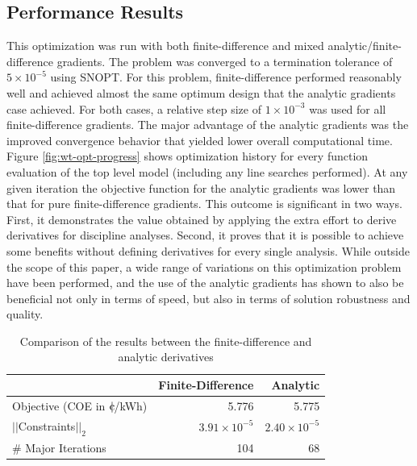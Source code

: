 \documentclass[]{aiaa-tc} %
\newcommand{\cent}{{\mathrm{c}\mkern-6.5mu{\mid}}}
\begin{document}
    \subsection{Performance Results}
        This optimization was run with both finite-difference and mixed analytic/finite-difference gradients.  The problem was converged to a termination tolerance of $5\times10^{-5}$ using SNOPT.  For this problem, finite-difference performed reasonably well and achieved almost the same optimum design that the analytic gradients case achieved. For both cases, a relative step size of $1\times10^{-3}$ was used for all
        finite-difference gradients. The major advantage of the analytic gradients was the improved convergence
        behavior that yielded lower overall computational time.  Figure \ref{fig:wt-opt-progress} shows optimization
        history for every function evaluation of the top level model (including any line searches performed). At any given iteration the objective function for the analytic gradients was lower than that for pure finite-difference gradients. This outcome is significant in two ways. First, it demonstrates the value obtained by applying the extra effort to derive derivatives for discipline analyses. Second, it proves that it is possible to achieve some benefits without defining derivatives for every single analysis. While outside the scope of this paper, a wide range of variations on this optimization problem have been performed, and the use of the analytic gradients has shown to also be beneficial not only in terms of speed, but also in terms of solution robustness and quality.



        \begin{table}
            \centering
            \caption{Comparison of the results between the finite-difference and analytic derivatives}
            \begin{tabular}{lrr}
                \toprule
                             & Finite-Difference & Analytic \\
                \midrule
                Objective (COE  in $\cent$/kWh)         & 5.776  & 5.775 \\  \hline
                $||$Constraints$||_2$                  & $3.91\times10^{-5}$ & $2.40\times10^{-5}$  \\  \hline
                \# Major Iterations                   &  104 & 68  \\
                \bottomrule
            \end{tabular}
            \label{tab:wt-fd-speeds}
        \end{table}
\end{document}
